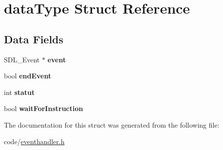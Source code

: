 \hypertarget{structdataType}{}\section{data\+Type Struct Reference}
\label{structdataType}
\subsection*{Data Fields}
\begin{DoxyCompactItemize}
\item 
S\+D\+L\+\_\+\+Event $\ast$ {\bfseries event}\hypertarget{structdataType_a66e2315989d12edbc5573c0ec31b77a8}{}\label{structdataType_a66e2315989d12edbc5573c0ec31b77a8}

\item 
bool {\bfseries end\+Event}\hypertarget{structdataType_ae0ebf19018dace13b92033d6f442ae09}{}\label{structdataType_ae0ebf19018dace13b92033d6f442ae09}

\item 
int {\bfseries statut}\hypertarget{structdataType_a676eda07c76fe8fcb098c0e9b943c4e0}{}\label{structdataType_a676eda07c76fe8fcb098c0e9b943c4e0}

\item 
bool {\bfseries wait\+For\+Instruction}\hypertarget{structdataType_ab16dd8fd283ccce243f21881b2598034}{}\label{structdataType_ab16dd8fd283ccce243f21881b2598034}

\end{DoxyCompactItemize}


The documentation for this struct was generated from the following file\+:\begin{DoxyCompactItemize}
\item 
code/\hyperlink{eventhandler_8h}{eventhandler.\+h}\end{DoxyCompactItemize}
